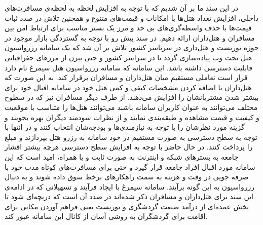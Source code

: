 در این سند ما بر آن شدیم که با توجه به افزایش لحظه به لحظه‌ی مسافرت‌های داخلی، افزایش تعداد هتل‌ها با امکانات و قیمت‌های متنوع و همچنین تلاش در صدد ثبات قیمت‌ها با حذف واسطه‌گری‌های بی حد و مرز یک بستر مناسب برای ارتباط امن بین مسافران و هتل‌داران ارائه دهیم. در سند پیش رو با توجه به گستردگی بازار موجود در حوزه توریست و هتل‌داری در سرتاسر کشور تلاش بر آن شد که یک سامانه رزرواسیون هتل تحت وب پیاده‌سازی گردد تا در سراسر کشور و حتی بیرن از مرزهای جغرافیایی قابلیت دسترسی داشته باشد. این سامانه که سامانه رزرواسیون هتل سیمرغ نام دارد قرار است تعاملی مستقیم میان هتل‌داران و مسافران برقرار کند. به این صورت که هتل‌داران با اضافه کردن مشخصات کیفی و کمی هتل خود در سامانه اقبال خود برای بیشتر شدن مشتریانشان را افزایش می‌دهند. از طرف دیگر مسافران نیز که در سطوح مختلف می‌توانند به عنوان کاربران سامانه باشند می‌توانند هتل‌ها را متناسب با موقعیت و کیفیت و قیمت مشاهده و طبقه‌بندی نمایند و از نظرات سودمند دیگران بهره بجویند و گزینه مورد نظرشان را با توجه به نیازمندی‌ها و بودجه‌شان انتخاب کنند و در انتها با توجه به سطح دسترسی به صورت مستقیم در خود سامانه به رزرو هتل بپردازند و مبلغ را پرداخت کنند.
\newline
در حال حاضر با توجه به افزایش سطح دسترسی هرچه بیشتر اقشار جامعه به بسترهای شبکه و اینترنت به صورت ثابت و یا همراه، امید است که این سامانه مورد اقبال افراد جامعه قرار گیرد و حتی برای مسافرت‌های کوتاه مدت خود با صرفه جویی در وقت و هزینه به سمت راهکارهای برخط سوق داده شوند و به دنبال رزرواسیون به این گونه برآیند. سامانه سیمرغ با ایجاد فرآیند و تسهیلاتی که در ادامه‌ی این سند برای هتل‌داران و مسافران ذکر شده‌اند در صدد آن است که دریچه‌ای شود تا بخش عمده‌ای از درآمد صنعت گردشگری و توریست یعنی فراهم آوردن مکانی برای اقامت برای گردشگران به روشی‌ آسان از کانال این سامانه عبور کند.